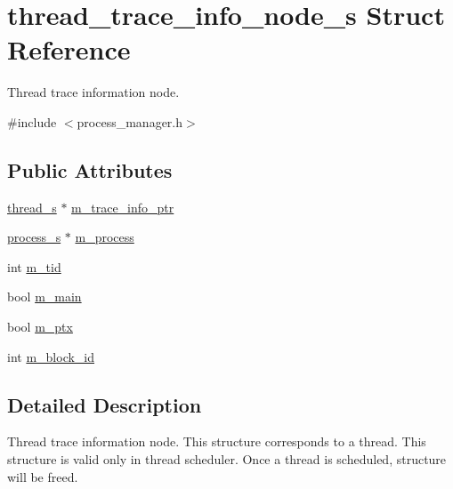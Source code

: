 \hypertarget{structthread__trace__info__node__s}{
\section{thread\_\-trace\_\-info\_\-node\_\-s Struct Reference}
\label{structthread__trace__info__node__s}
}


Thread trace information node.  




{\ttfamily \#include $<$process\_\-manager.h$>$}

\subsection*{Public Attributes}
\begin{DoxyCompactItemize}
\item 
\hyperlink{structthread__s}{thread\_\-s} $\ast$ \hyperlink{structthread__trace__info__node__s_ae603dda796c0cccf7f79d1ce5b9ce874}{m\_\-trace\_\-info\_\-ptr}
\item 
\hyperlink{structprocess__s}{process\_\-s} $\ast$ \hyperlink{structthread__trace__info__node__s_a1b4fbce5655a7094c48f8dd7be4f9dd4}{m\_\-process}
\item 
int \hyperlink{structthread__trace__info__node__s_a52c5e7d8ed10fc7c54cdabcc15702cac}{m\_\-tid}
\item 
bool \hyperlink{structthread__trace__info__node__s_a241862d3ffe48c4ab7c85456244cf7dc}{m\_\-main}
\item 
bool \hyperlink{structthread__trace__info__node__s_a0355328ae8596c5029df7ac4a2c0eca7}{m\_\-ptx}
\item 
int \hyperlink{structthread__trace__info__node__s_a8502fed3f5ce2865bf0b517bdbd5ef79}{m\_\-block\_\-id}
\end{DoxyCompactItemize}


\subsection{Detailed Description}
Thread trace information node. This structure corresponds to a thread. This structure is valid only in thread scheduler. Once a thread is scheduled, structure will be freed. 

